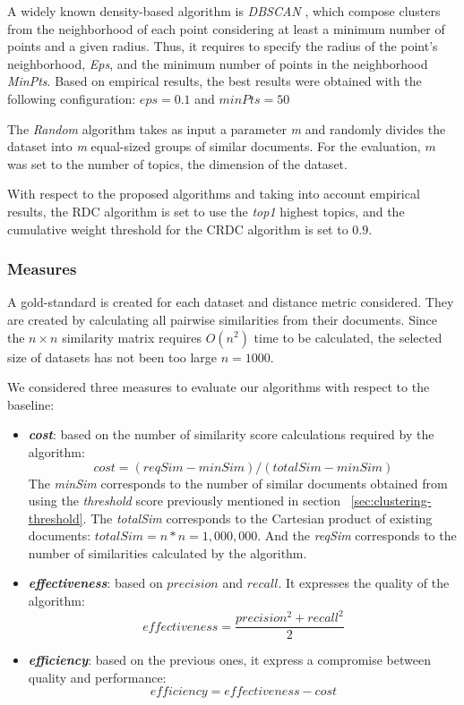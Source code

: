 A widely known density-based algorithm is \textit{DBSCAN} \citep{Ester1996}, which compose clusters from the neighborhood of each point considering at least a minimum number of points and a given radius. Thus, it requires to specify the radius of the point's neighborhood, \textit{Eps}, and the minimum number of points in the neighborhood \textit{MinPts}. Based on empirical results, the best results were obtained with the following configuration: $eps=0.1$ and $minPts=50$

The \textit{Random} algorithm takes as input a parameter \textit{m} and randomly divides the dataset into \textit{m} equal-sized groups of similar documents. For the evaluation, $m$ was set to the number of topics, the dimension of the dataset.

With respect to the proposed algorithms and taking into account empirical results, the RDC algorithm is set to use the \textit{top1} highest topics, and the cumulative weight threshold for the CRDC algorithm is set to $0.9$.

\subsubsection{Measures}

A gold-standard is created for each dataset and distance metric considered. They are created by calculating all pairwise similarities from their documents. Since the $n \times n$ similarity matrix requires $O(n^2)$ time to be calculated, the selected size of datasets has not been too large $n=1000$.

We considered three measures to evaluate our algorithms with respect to the baseline:
\begin{itemize}
  \item \textbf{\textit{cost}}: based on the number of similarity score calculations required by the algorithm:
\begin{equation}
cost=(reqSim - minSim)/(totalSim - minSim)
\end{equation}
The \textit{minSim} corresponds to the number of similar documents obtained from using the \textit{threshold} score previously mentioned in section ~\ref{sec:clustering-threshold}. The \textit{totalSim} corresponds to the Cartesian product of existing documents: $totalSim=n*n=1,000,000$. And the \textit{reqSim} corresponds to the number of similarities calculated by the algorithm.
  \item \textbf{\textit{effectiveness}}: based on $precision$ and $recall$. It expresses the quality of the algorithm:
\begin{equation}
 effectiveness = \frac{precision^2  + recall^2}{2}
\end{equation}
  \item \textbf{\textit{efficiency}}: based on the previous ones, it express a compromise between quality and performance:
\begin{equation}
 efficiency = effectiveness - cost
\end{equation}
\end{itemize}


